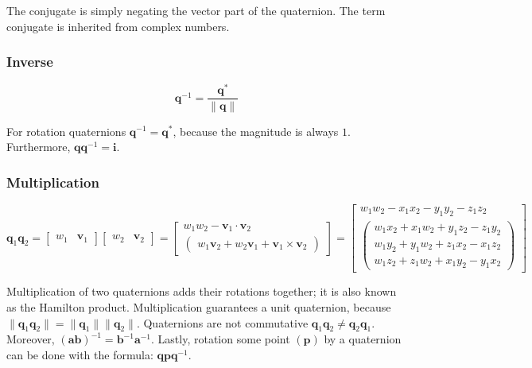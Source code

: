 \documentclass[a4paper,11pt]{article}
\begin{document}
The conjugate is simply negating the vector part of the quaternion. The term conjugate is inherited from complex numbers.

\subsubsection{Inverse}

$$\textbf{q}^{-1}=\frac{\textbf{q}^*}{\|\textbf{q}\|}$$

For rotation quaternions $\textbf{q}^{-1}=\textbf{q}^*$, because the magnitude is always $1$. Furthermore, $\textbf{q}\textbf{q}^{-1}=\textbf{i}$.

\subsubsection{Multiplication}

$$
\textbf{q}_1\textbf{q}_2=\begin{bmatrix}
	w_1 & \textbf{v}_1
\end{bmatrix}\begin{bmatrix}
	w_2 & \textbf{v}_2
\end{bmatrix}=\begin{bmatrix}
	w_1w_2-\textbf{v}_1\cdot\textbf{v}_2 \\
	\begin{pmatrix}
		w_1\textbf{v}_2 + w_2\textbf{v}_1 + \textbf{v}_1\times\textbf{v}_2
	\end{pmatrix}
\end{bmatrix}
=\begin{bmatrix}
	w_1w_2-x_1x_2-y_1y_2-z_1z_2 \\
	\begin{pmatrix}
		w_1x_2 + x_1w_2 + y_1z_2 - z_1y_2 \\
		w_1y_2 + y_1w_2 + z_1x_2 - x_1z_2 \\
		w_1z_2 + z_1w_2 + x_1y_2 - y_1x_2
	\end{pmatrix}
\end{bmatrix}
$$

Multiplication of two quaternions adds their rotations together; it is also known as the Hamilton product. Multiplication guarantees a unit quaternion, because $\|\textbf{q}_1\textbf{q}_2\|=\|\textbf{q}_1\|\|\textbf{q}_2\|$. Quaternions are not commutative $\textbf{q}_1\textbf{q}_2\neq\textbf{q}_2\textbf{q}_1$. Moreover, $(\textbf{ab})^{-1}=\textbf{b}^{-1}\textbf{a}^{-1}$. Lastly, rotation some point $(\textbf{p})$ by a quaternion can be done with the formula: $\textbf{qp}\textbf{q}^{-1}$.
\end{document}
